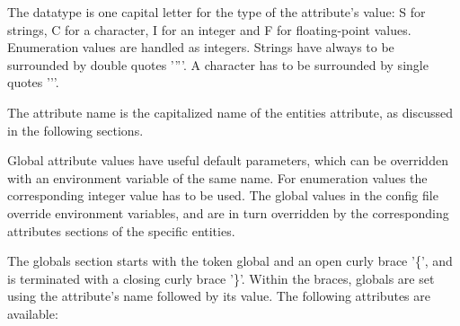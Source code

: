 \documentclass[10pt,a4]{scrartcl}
\begin{document}
The datatype is one capital letter for the type of the attribute's
value: \textsf{S} for strings, \textsf{C} for a character, \textsf{I}
for an integer and \textsf{F} for floating-point values. Enumeration
values are handled as integers. Strings have always to be surrounded by
double quotes '\textsf{''}'. A character has to be surrounded by single
quotes '\textsf{'}'.

The attribute name is the capitalized name of the entities attribute, as
discussed in the following sections.

Global attribute values have useful default parameters, which can be
overridden with an environment variable of the same name. For enumeration
values the corresponding integer value has to be used. The global values
in the config file override environment variables, and are in turn
overridden by the corresponding attributes sections of the specific
entities.

The globals section starts with the token \textsf{global} and an open
curly brace '\textsf{\{}', and is terminated with a closing curly brace
'\textsf{\}}'. Within the braces, globals are set using the attribute's
name followed by its value. The following attributes are available:
\end{document}
